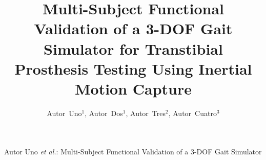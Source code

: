 \documentclass[journal,twocolumn,letterpaper]{IEEEJERM}
\begin{document}
\vspace{1 cm}

\title{Multi-Subject Functional Validation of a 3-DOF Gait Simulator for
Transtibial Prosthesis Testing Using Inertial Motion Capture}

\author{Autor~Uno$^1$,
        Autor~Dos$^1$,
        Autor~Tres$^2$,
        Autor~Cuatro$^{3}$
}

{Autor Uno \MakeLowercase{\textit{et al.}}: Multi-Subject Functional Validation of a 3-DOF Gait Simulator}
\end{document}
